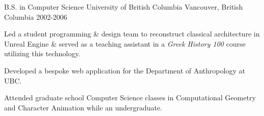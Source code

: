 

\begin{cventries}

  \cventry
    {B.S. in Computer Science} %
    {University of British Columbia} %
    {Vancouver, British Columbia} %
    {2002-2006} %
    {
      \begin{cvitems} %
        \item {Led a student programming \& design team to reconstruct classical architecture in Unreal Engine \& served as a teaching assistant in a \textit{Greek History 100} course utilizing this technology.}
        \item {Developed a bespoke web application for the Department of Anthropology at UBC.}
        \item {Attended graduate school Computer Science classes in Computational Geometry and Character Animation while an undergraduate.}
      \end{cvitems}
    }

\end{cventries}
